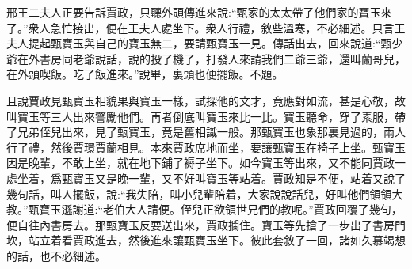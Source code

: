 \begin{parag}
    邢王二夫人正要告訴賈政，只聽外頭傳進來說:“甄家的太太帶了他們家的寶玉來了。”衆人急忙接出，便在王夫人處坐下。衆人行禮，敘些溫寒，不必細述。只言王夫人提起甄寶玉與自己的寶玉無二，要請甄寶玉一見。傳話出去，回來說道:“甄少爺在外書房同老爺說話，說的投了機了，打發人來請我們二爺三爺，還叫蘭哥兒，在外頭喫飯。吃了飯進來。”說畢，裏頭也便擺飯。不題。
\end{parag}


\begin{parag}
    且說賈政見甄寶玉相貌果與寶玉一樣，試探他的文才，竟應對如流，甚是心敬，故叫寶玉等三人出來警勵他們。再者倒底叫寶玉來比一比。寶玉聽命，穿了素服，帶了兄弟侄兒出來，見了甄寶玉，竟是舊相識一般。那甄寶玉也象那裏見過的，兩人行了禮，然後賈環賈蘭相見。本來賈政席地而坐，要讓甄寶玉在椅子上坐。甄寶玉因是晚輩，不敢上坐，就在地下鋪了褥子坐下。如今寶玉等出來，又不能同賈政一處坐着，爲甄寶玉又是晚一輩，又不好叫寶玉等站着。賈政知是不便，站着又說了幾句話，叫人擺飯，說:“我失陪，叫小兒輩陪着，大家說說話兒，好叫他們領領大教。”甄寶玉遜謝道:“老伯大人請便。侄兒正欲領世兄們的教呢。”賈政回覆了幾句，便自往內書房去。那甄寶玉反要送出來，賈政攔住。寶玉等先搶了一步出了書房門坎，站立着看賈政進去，然後進來讓甄寶玉坐下。彼此套敘了一回，諸如久慕竭想的話，也不必細述。
\end{parag}


